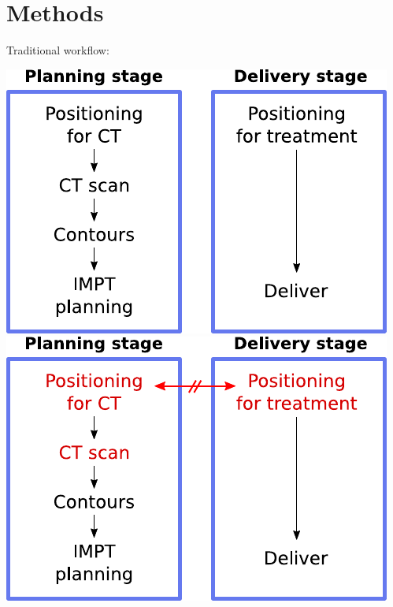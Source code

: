 \section{Methods}

\begin{frame}[c]{Traditional workflow:}
    \begin{overprint}
    \includegraphics[scale=0.86]{imgs/workflow_trad_1.pdf}
    \includegraphics[scale=0.86]{imgs/workflow_trad_2.pdf}
    \end{overprint}
\end{frame}

